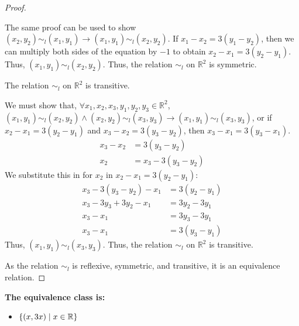 \documentclass[11pt]{scrartcl}
\theoremstyle{dotlessP}
\theoremstyle{dotlessN}
\DeclarePairedDelimiter\set{\{}{\}}
\newcommand{\reals}{\mathbb{R}} %
\begin{document}
\begin{enumerate}[(a)]
\begin{proof}
\begin{subproof}
The same proof can be used to show $(x_2, y_2) \sim_l (x_1,y_1) \to (x_1, y_1) \sim_l (x_2, y_2)$. If $x_1 - x_2 = 3(y_1 - y_2)$, then we can multiply both sides of the equation by $-1$ to obtain $x_2 - x_1 = 3(y_2 - y_1)$. Thus, $(x_1, y_1) \sim_l (x_2, y_2)$. Thus, the relation $\sim_l$ on $\reals^2$ is symmetric.
			\end{subproof}
			\begin{claim*}
				The relation $\sim_l$ on $\reals^2$ is transitive.
			\end{claim*}
			\begin{subproof}
				[Subproof]
				We must show that, $\forall x_1,x_2,x_3,y_1,y_2,y_3 \in \reals^2$, $(x_1,y_1) \sim_l (x_2,y_2) \land (x_2,y_2) \sim_l (x_3,y_3) \to (x_1,y_1) \sim_l (x_3,y_3)$, or if  $x_2 - x_1 = 3(y_2 - y_1)$ and  $x_3 - x_2 = 3(y_3 - y_2)$, then  $x_3 - x_1 = 3(y_3 - x_1)$. 
				\begin{align*}
					x_3 - x_2 &= 3(y_3 - y_2) \\
					x_2 &= x_3 - 3(y_3 - y_2)
				\end{align*}
				We substitute this in for $x_2$ in $x_2 - x_1 = 3(y_2 - y_1)$:
				\begin{align*}
					x_3 - 3(y_3 - y_2) - x_1 &= 3(y_2 - y_1) \\
					x_3 - 3y_3 + 3y_2 - x_1 &= 3y_2 - 3y_1 \\
					x_3 - x_1 &= 3y_3 - 3y_1 \\
					x_3 - x_1 &= 3(y_3 - y_1)
				\end{align*}
				Thus, $(x_1, y_1) \sim_l (x_3, y_3)$. Thus, the relation $\sim_l$ on $\reals^2$ is transitive.
			\end{subproof}
		As the relation $\sim_l$ is reflexive, symmetric, and transitive, it is an equivalence relation.
		\end{proof}
		\textbf{The equivalence class is:}
		\begin{itemize}
			\item $\set*{(x,3x) \mid x \in \reals}$
		\end{itemize}
\end{enumerate}
\end{document}
